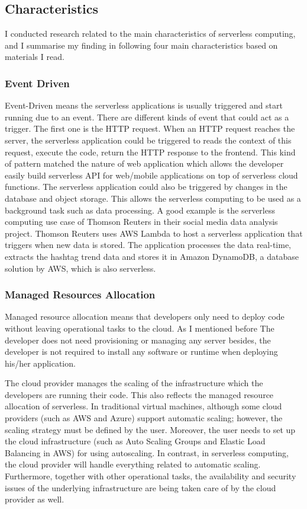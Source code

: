 \subsection{Characteristics}
I conducted research related to the main characteristics of serverless computing, and I summarise my finding in following four main characteristics based on materials \cite{castro2019rise}\cite{lee2018evaluation}\cite{jonas2019cloud} I read.
\subsubsection{Event Driven}
Event-Driven means the serverless applications is usually triggered and start running due to an event. There are different kinds of event that could act as a trigger. The first one is the HTTP request. When an HTTP request reaches the server, the serverless application could be triggered to reads the context of this request, execute the code, return the HTTP response to the frontend. This kind of pattern matched the nature of web application which allows the developer easily build serverless API for web/mobile applications on top of serverless cloud functions. The serverless application could also be triggered by changes in the database and object storage. This allows the serverless computing to be used as a background task such as data processing. A good example is the serverless computing use case of Thomson Reuters in their social media data analysis project\cite{ThomsonR38:online}. Thomson Reuters uses AWS Lambda to host a serverless application that triggers when new data is stored. The application processes the data real-time, extracts the hashtag trend data and stores it in Amazon DynamoDB, a database solution by AWS, which is also serverless.
\subsubsection{Managed Resources Allocation}
Managed resource allocation means that developers only need to deploy code without leaving operational tasks to the cloud. As I mentioned before The developer does not need provisioning or managing any server besides, the developer is not required to install any software or runtime \cite{Serverle64:online} when deploying his/her application. 
\par
The cloud provider manages the scaling of the infrastructure which the developers are running their code. This also reflects the managed resource allocation of serverless. In traditional virtual machines, although some cloud providers (such as AWS and Azure) support automatic scaling; however, the scaling strategy must be defined by the user. Moreover, the user needs to set up the cloud infrastructure (such as Auto Scaling Groups and Elastic Load Balancing in AWS) for using autoscaling. In contrast, in serverless computing, the cloud provider will handle everything related to automatic scaling.
Furthermore, together with other operational tasks, the availability and security issues of the underlying infrastructure are being taken care of by the cloud provider as well. 
